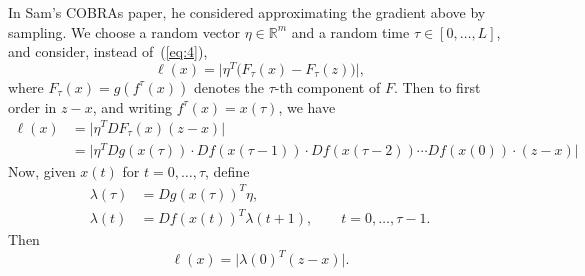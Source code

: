 \documentclass[11pt]{article}
\begin{document}
In Sam's COBRAs paper, he considered approximating the gradient above by
sampling.  We choose a random vector $\eta\in\mathbb{R}^m$ and a random time
$\tau\in[0,\ldots,L]$, and consider, instead of~(\ref{eq:4}),
\begin{equation}
  \label{eq:7}
  \ell(x) = \big|\eta^T \big(F_\tau(x) - F_\tau(z)\big)\big|,
\end{equation}
where $F_\tau(x)=g(f^\tau(x))$ denotes the $\tau$-th component of $F$.  Then to
first order in $z-x$, and writing $f^\tau(x)=x(\tau)$, we have
\begin{align}
  \label{eq:8}
  \ell(x) &= \big|\eta^T DF_\tau(x) (z-x)\big|\\
          & = \big|\eta^T Dg(x(\tau)) \cdot Df(x(\tau-1)) \cdot Df(x(\tau-2))\cdots
            Df(x(0))\cdot (z-x)\big|
\end{align}
Now, given $x(t)$ for $t=0,\ldots,\tau$, define
\begin{align}
  \lambda(\tau) &= Dg(x(\tau))^T \eta,\\
  \lambda(t) &= Df(x(t))^T \lambda(t+1),\qquad t=0,\ldots,\tau-1.
\end{align}
Then
\begin{equation}
  \label{eq:9}
  \ell(x) = \big|\lambda(0)^T (z - x)\big|.
\end{equation}
\end{document}
